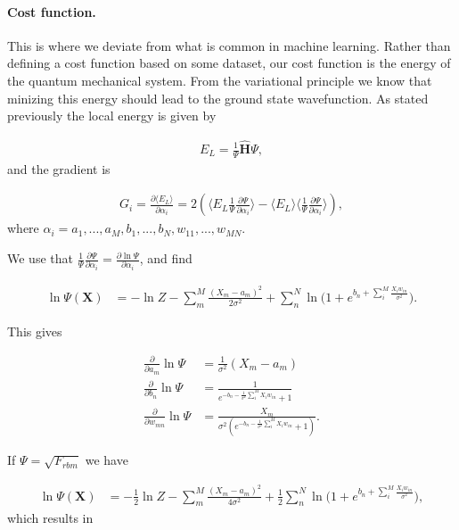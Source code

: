 \documentclass[%
oneside,                 %
final,                   %
10pt]{article}
\begin{document}
\paragraph{Cost function.}
This is where we deviate from what is common in machine
learning. Rather than defining a cost function based on some dataset,
our cost function is the energy of the quantum mechanical system. From
the variational principle we know that minizing this energy should
lead to the ground state wavefunction. As stated previously the local
energy is given by

\begin{align}
	E_L = \frac{1}{\Psi} \hat{\mathbf{H}} \Psi,
\end{align}
and the gradient is

\begin{align}
	G_i = \frac{\partial \langle E_L \rangle}{\partial \alpha_i}
	= 2(\langle E_L \frac{1}{\Psi}\frac{\partial \Psi}{\partial \alpha_i} \rangle - \langle E_L \rangle \langle \frac{1}{\Psi}\frac{\partial \Psi}{\partial \alpha_i} \rangle ),
\end{align}
where $\alpha_i = a_1,...,a_M,b_1,...,b_N,w_{11},...,w_{MN}$.

We use that $\frac{1}{\Psi}\frac{\partial \Psi}{\partial \alpha_i} 
	= \frac{\partial \ln{\Psi}}{\partial \alpha_i}$,
and find

\begin{align}
	\ln{\Psi({\mathbf{X}})} &= -\ln{Z} - \sum_m^M \frac{(X_m - a_m)^2}{2\sigma^2}
	+ \sum_n^N \ln({1 + e^{b_n + \sum_i^M \frac{X_i w_{in}}{\sigma^2}})}.
\end{align}

This gives

\begin{align}
	\frac{\partial }{\partial a_m} \ln\Psi
	&= 	\frac{1}{\sigma^2} (X_m - a_m) \\
	\frac{\partial }{\partial b_n} \ln\Psi
	&=
	\frac{1}{e^{-b_n-\frac{1}{\sigma^2}\sum_i^M X_i w_{in}} + 1} \\
	\frac{\partial }{\partial w_{mn}} \ln\Psi
	&= \frac{X_m}{\sigma^2(e^{-b_n-\frac{1}{\sigma^2}\sum_i^M X_i w_{in}} + 1)}.
\end{align}

If $\Psi = \sqrt{F_{rbm}}$ we have

\begin{align}
	\ln{\Psi({\mathbf{X}})} &= -\frac{1}{2}\ln{Z} - \sum_m^M \frac{(X_m - a_m)^2}{4\sigma^2}
	+ \frac{1}{2}\sum_n^N \ln({1 + e^{b_n + \sum_i^M \frac{X_i w_{in}}{\sigma^2}})},
\end{align}
which results in
\end{document}
